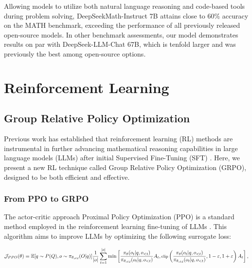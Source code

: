 \begin{itemize}[topsep=0pt]
Allowing models to utilize both natural language reasoning and code-based tools during problem solving, DeepSeekMath-Instruct 7B attains close to 60\% accuracy on the MATH benchmark, exceeding the performance of all previously released open-source models. In other benchmark assessments, our model demonstrates results on par with DeepSeek-LLM-Chat 67B, which is tenfold larger and was previously the best among open-source options.

\section{Reinforcement Learning}

\subsection{Group Relative Policy Optimization} Previous work has established that reinforcement learning (RL) methods are instrumental in further advancing mathematical reasoning capabilities in large language models (LLMs) after initial Supervised Fine-Tuning (SFT) \citep{wang2023math,wizardmath}. Here, we present a new RL technique called Group Relative Policy Optimization (GRPO), designed to be both efficient and effective.

\subsubsection{From PPO to GRPO} The actor-critic approach Proximal Policy Optimization (PPO) \citep{schulman2017proximal} is a standard method employed in the reinforcement learning fine-tuning of LLMs \citep{ouyang2022training}. This algorithm aims to improve LLMs by optimizing the following surrogate loss:

\begin{equation}
\footnotesize
            \mathcal{J}_{PPO}(\theta) = \mathbb{E}{[q \sim P(Q), o \sim \pi_{\theta_{old}}(O|q)]} \frac{1}{|o|} \sum_{t=1}^{|o|} \min \left[ \frac{\pi_\theta(o_{t} | q, o_{<t})}{\pi_{\theta_{old}}(o_{t} | q, o_{<t})} A_{t}, \text{clip} \left( \frac{\pi_\theta(o_{t} | q, o_{<t})}{\pi_{\theta_{old}}(o_{t} | q, o_{<t})}, 1 - \varepsilon, 1 + \varepsilon \right)  A_{t} \right] ,
\end{equation}


\end{itemize}
